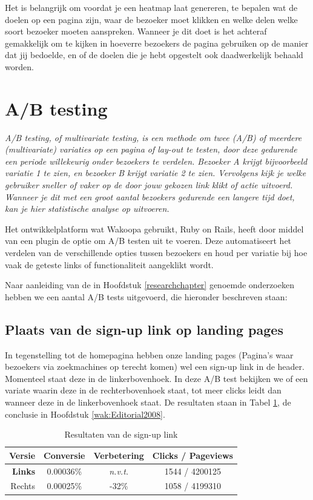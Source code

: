 \documentclass[a4paper, 10pt, pdftex]{report}
\begin{document}
    Het is belangrijk om voordat je een heatmap laat genereren, te bepalen wat de doelen op een pagina zijn, waar de bezoeker moet klikken en welke delen welke soort bezoeker moeten aanspreken. Wanneer je dit doet is het achteraf gemakkelijk om te kijken in hoeverre bezoekers de pagina gebruiken op de manier dat jij bedoelde, en of de doelen die je hebt opgestelt ook daadwerkelijk behaald worden.


    \section{A/B testing}
    \textit{A/B testing, of multivariate testing, is een methode om twee (A/B) of meerdere (multivariate) variaties op een pagina of lay-out te testen, door deze gedurende een periode willekeurig onder bezoekers te verdelen. Bezoeker \emph{A} krijgt bijvoorbeeld variatie 1 te zien, en bezoeker \emph{B} krijgt variatie 2 te zien. Vervolgens kijk je welke gebruiker sneller of vaker op de door jouw gekozen link klikt of actie uitvoerd. Wanneer je dit met een groot aantal bezoekers gedurende een langere tijd doet, kan je hier statistische analyse op uitvoeren.}

   Het ontwikkelplatform wat Wakoopa gebruikt, Ruby on Rails, heeft door middel van een plugin de optie om A/B testen uit te voeren. Deze automatiseert het verdelen van de verschillende opties tussen bezoekers en houd per variatie bij hoe vaak de geteste links of functionaliteit aangeklikt wordt.

    Naar aanleiding van de in Hoofdstuk \ref{researchchapter} genoemde onderzoeken hebben we een aantal A/B tests uitgevoerd, die hieronder beschreven staan:

    \subsection{Plaats van de sign-up link op landing pages}
      \label{ctatest}
      In tegenstelling tot de homepagina hebben onze landing pages (Pagina's waar bezoekers via zoekmachines op terecht komen) wel een sign-up link in de header. Momenteel staat deze in de linkerbovenhoek. In deze A/B test bekijken we of een variate waarin deze in de rechterbovenhoek staat, tot meer clicks leidt dan wanneer deze in de linkerbovenhoek staat. De resultaten staan in Tabel \ref{tab:signupcta}, de conclusie in Hoofdstuk \ref{wak:Editorial2008}.

      \begin{table}[ht]
      \centering
      \begin{tabular}{r|*{3}{c}}
        \textbf{Versie}  & Conversie  & Verbetering & Clicks / Pageviews \\ \hline
        \textbf{Links}   & 0.00036\%  & \emph{n.v.t.}        & 1544 / 4200125 \\
        Rechts  & 0.00025\%  & -32\%                & 1058 / 4199310 \\
      \end{tabular}
      \caption{Resultaten van de sign-up link}
      \label{tab:signupcta}
      \end{table}
\end{document}
